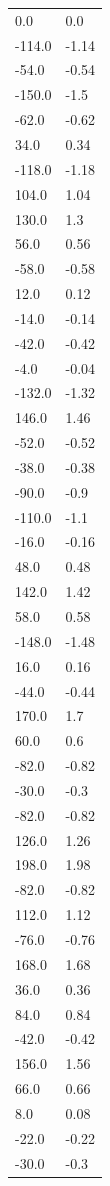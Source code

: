 \begin{longtable}{ll}
0.0 & 0.0 \\
-114.0 & -1.14 \\
-54.0 & -0.54 \\
-150.0 & -1.5 \\
-62.0 & -0.62 \\
34.0 & 0.34 \\
-118.0 & -1.18 \\
104.0 & 1.04 \\
130.0 & 1.3 \\
56.0 & 0.56 \\
-58.0 & -0.58 \\
12.0 & 0.12 \\
-14.0 & -0.14 \\
-42.0 & -0.42 \\
-4.0 & -0.04 \\
-132.0 & -1.32 \\
146.0 & 1.46 \\
-52.0 & -0.52 \\
-38.0 & -0.38 \\
-90.0 & -0.9 \\
-110.0 & -1.1 \\
-16.0 & -0.16 \\
48.0 & 0.48 \\
142.0 & 1.42 \\
58.0 & 0.58 \\
-148.0 & -1.48 \\
16.0 & 0.16 \\
-44.0 & -0.44 \\
170.0 & 1.7 \\
60.0 & 0.6 \\
-82.0 & -0.82 \\
-30.0 & -0.3 \\
-82.0 & -0.82 \\
126.0 & 1.26 \\
198.0 & 1.98 \\
-82.0 & -0.82 \\
112.0 & 1.12 \\
-76.0 & -0.76 \\
168.0 & 1.68 \\
36.0 & 0.36 \\
84.0 & 0.84 \\
-42.0 & -0.42 \\
156.0 & 1.56 \\
66.0 & 0.66 \\
8.0 & 0.08 \\
-22.0 & -0.22 \\
-30.0 & -0.3 \\

\end{longtable}
